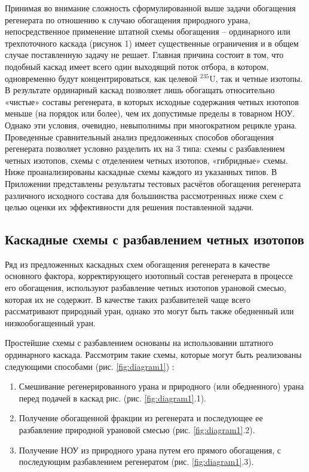 Принимая во внимание сложность сформулированной выше задачи обогащения регенерата по отношению к случаю обогащения природного урана, непосредственное применение штатной схемы обогащения -- ординарного или трехпоточного каскада (рисунок 1) имеет существенные ограничения и в общем случае поставленную задачу не решает. Главная причина состоит в том, что подобный каскад имеет всего один выходящий поток отбора, в котором, одновременно будут концентрироваться, как целевой  $^{235}$U, так и четные изотопы. В результате ординарный каскад позволяет лишь обогащать относительно «чистые» составы регенерата, в которых исходные содержания четных изотопов меньше (на порядок или более), чем их допустимые пределы в товарном НОУ. Однако эти условия, очевидно, невыполнимы при многократном рецикле урана.
Проведенные сравнительный анализ предложенных способов обогащения регенерата позволяет условно разделить их на 3 типа: схемы с разбавлением четных изотопов,  схемы с отделением четных изотопов, «гибридные» схемы. 
Ниже проанализированы каскадные схемы каждого из указанных типов. В Приложении представлены результаты тестовых расчётов обогащения регенерата различного исходного состава для большинства рассмотренных ниже схем с целью оценки их эффективности для решения поставленной задачи.

\subsection{Каскадные схемы с разбавлением четных изотопов}

Ряд из предложенных каскадных схем обогащения регенерата в качестве основного фактора, корректирующего изотопный состав регенерата в процессе его обогащения, используют разбавление четных изотопов урановой смесью, которая их не содержит. В качестве таких разбавителей чаще всего рассматривают природный уран, однако это могут быть также обедненный или низкообогащенный уран.

Простейшие схемы с разбавлением основаны на использовании штатного ординарного каскада. Рассмотрим такие схемы, которые могут быть реализованы следующими способами (рис. \ref{fig:diagram1}) \cite{sulaberidzeNekotoryhRazdelitelnyhProblemah2004,smirnovKaskadnyeShemyZadachah2012}:

\begin{enumerate}
  \item Смешивание регенерированного урана и природного (или обедненного) урана перед подачей в каскад рис. (рис. \ref{fig:diagram1}.1).
  \item Получение обогащенной фракции из регенерата и последующее ее разбавление природной урановой смесью (рис. \ref{fig:diagram1}.2).
  \item Получение НОУ из природного урана путем его прямого обогащения, с последующим разбавлением регенератом (рис. \ref{fig:diagram1}.3).
\end{enumerate}

